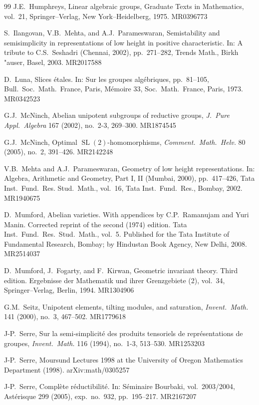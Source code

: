 \documentclass[11pt,a4paper]{article}
\theoremstyle{plain}
\theoremstyle{definition}
\DeclareMathOperator{\SL}{SL}
\begin{document}
\begin{thebibliography}{99}
J.E.~Humphreys, Linear algebraic groups, Graduate Texts in Mathematics, vol.~21, Springer--Verlag, New York--Heidelberg, 1975. MR0396773

S.~Ilangovan, V.B.~Mehta, and A.J.~Parameswaran, Semistability and semisimplicity in representations of low height in positive characteristic. In: A tribute to C.S.~Seshadri (Chennai, 2002), pp.~271--282, Trends Math., Birkh{\\"a}user, Basel, 2003. MR2017588

D.~Luna, Slices \'etales. In: Sur les groupes alg\'ebriques, pp.~81--105, Bull.~Soc.~Math.~France, Paris, M\'emoire 33, Soc.~Math.~France, Paris, 1973. MR0342523

G.J.~McNinch, Abelian unipotent subgroups of reductive groups, \textit{J.~Pure Appl.~Algebra} 167 (2002), no.~2-3, 269--300. MR1874545

G.J.~McNinch, Optimal $\SL(2)$-homomorphisms, \textit{Comment.~Math.~Helv.} 80 (2005), no.~2, 391--426. MR2142248

V.B.~Mehta and A.J.~Parameswaran, Geometry of low height representations. In: Algebra, Arithmetic and Geometry, Part I, II (Mumbai, 2000), pp.~417--426, Tata Inst.~Fund.~Res. Stud.~Math., vol.~16, Tata Inst.~Fund.~Res., Bombay, 2002. MR1940675

D.~Mumford, Abelian varieties. With appendices by C.P.~Ramanujam and Yuri Manin. Corrected reprint of the second (1974) edition. Tata Inst.~Fund.~Res.~Stud.~Math., vol.~5. Published for the Tata Institute of Fundamental Research, Bombay; by Hindustan Book Agency, New Delhi, 2008. MR2514037

D.~Mumford, J.~Fogarty, and F.~Kirwan, Geometric invariant theory. Third edition. Ergebnisse der Mathematik und ihrer Grenzgebiete (2), vol.~34, Springer--Verlag, Berlin, 1994. MR1304906

G.M.~Seitz, Unipotent elements, tilting modules, and saturation, \textit{Invent.~Math.} 141 (2000), no.~3, 467--502. MR1779618

J-P.~Serre, Sur la semi-simplicit\'e des produits tensoriels de repr\'esentations de groupes, \textit{Invent.~Math.} 116 (1994), no.~1-3, 513--530. MR1253203

J-P.~Serre, Moursund Lectures 1998 at the University of Oregon Mathematics Department (1998). arXiv:math/0305257

J-P.~Serre, Compl\`ete r\'eductibilit\'e. In: S\'eminaire Bourbaki, vol.~2003/2004, Ast\'erisque 299 (2005), exp.~no.~932, pp.~195--217. MR2167207


\end{thebibliography}
\end{document}

